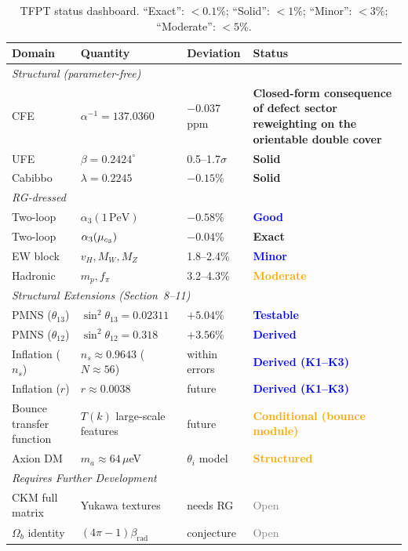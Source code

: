 \begin{table}[H]
\centering
\renewcommand{\arraystretch}{1.3}
\begin{tabular}{@{}p{3cm}p{4cm}p{3cm}l@{}}
\toprule
\textbf{Domain} & \textbf{Quantity} & \textbf{Deviation} & \textbf{Status}\\
\midrule
\multicolumn{4}{l}{\textit{Structural (parameter-free)}}\\
\quad CFE & $\alpha^{-1} = 137.0360$ & $-0.037$ ppm & \textcolor{green!60!black}{\textbf{Closed-form consequence of defect sector reweighting on the orientable double cover}}\\
\quad UFE & $\beta = 0.2424^\circ$ & 0.5--1.7$\sigma$ & \textcolor{green!60!black}{\textbf{Solid}}\\
\quad Cabibbo & $\lambda = 0.2245$ & $-0.15\%$ & \textcolor{green!60!black}{\textbf{Solid}}\\
\midrule
\multicolumn{4}{l}{\textit{RG-dressed}}\\
\quad Two-loop & $\alpha_3(1\,\text{PeV})$ & $-0.58\%$ & \textcolor{blue}{\textbf{Good}}\\
\quad Two-loop & $\alpha_3(\mu_{c_3})$ & $-0.04\%$ & \textcolor{green!60!black}{\textbf{Exact}}\\
\quad EW block & $v_H, M_W, M_Z$ & 1.8--2.4\% & \textcolor{blue}{\textbf{Minor}}\\
\quad Hadronic & $m_p, f_\pi$ & 3.2--4.3\% & \textcolor{orange}{\textbf{Moderate}}\\
\midrule
\multicolumn{4}{l}{\textit{Structural Extensions (Section~8--11)}}\\
\quad PMNS ($\theta_{13}$) & $\sin^2\theta_{13} = 0.02311$ & $+5.04\%$ & \textcolor{blue}{\textbf{Testable}}\\
\quad PMNS ($\theta_{12}$) & $\sin^2\theta_{12} = 0.318$ & $+3.56\%$ & \textcolor{blue}{\textbf{Derived}}\\
\quad Inflation ($n_s$) & $n_s \approx 0.9643$ ($N\approx 56$) & within errors & \textcolor{blue}{\textbf{Derived (K1--K3)}}\\
\quad Inflation ($r$) & $r \approx 0.0038$ & future & \textcolor{blue}{\textbf{Derived (K1--K3)}}\\
\quad Bounce transfer function & $T(k)$ large-scale features & future & \textcolor{orange}{\textbf{Conditional (bounce module)}}\\
\quad Axion DM & $m_a \approx 64\,\mu$eV & $\theta_i$ model & \textcolor{orange}{\textbf{Structured}}\\
\midrule
\multicolumn{4}{l}{\textit{Requires Further Development}}\\
\quad CKM full matrix & Yukawa textures & needs RG & \textcolor{gray}{Open}\\
\quad $\Omega_b$ identity & $(4\pi-1)\beta_{\text{rad}}$ & conjecture & \textcolor{gray}{Open}\\
\bottomrule
\end{tabular}
\caption{TFPT status dashboard. ``Exact'': $<0.1\%$; ``Solid'': $<1\%$; 
``Minor'': $<3\%$; ``Moderate'': $<5\%$.}
\label{tab:status}
\end{table}


